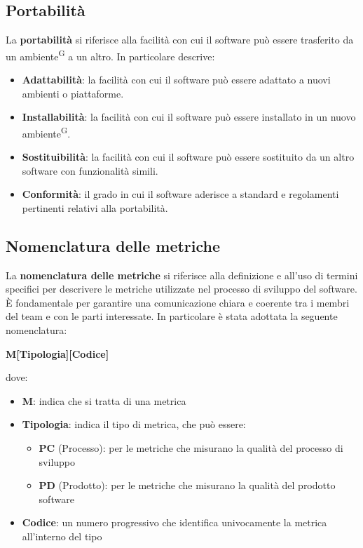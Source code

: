 \documentclass[a4paper, 11pt]{article}
\begin{document}
\subsection{Portabilità}
La \textbf{portabilità} si riferisce alla facilità con cui il software può essere trasferito da un ambiente\textsuperscript{G} a un altro.
In particolare descrive:
\begin{itemize}
    \item \textbf{Adattabilità}: la facilità con cui il software può essere adattato a nuovi ambienti o piattaforme.
    \item \textbf{Installabilità}: la facilità con cui il software può essere installato in un nuovo ambiente\textsuperscript{G}.
    \item \textbf{Sostituibilità}: la facilità con cui il software può essere sostituito da un altro software con funzionalità simili.
    \item \textbf{Conformità}: il grado in cui il software aderisce a standard e regolamenti pertinenti relativi alla portabilità.
\end{itemize}
\subsection{Nomenclatura delle metriche}
La \textbf{nomenclatura delle metriche} si riferisce alla definizione e all'uso di termini specifici per descrivere le metriche utilizzate nel processo di sviluppo del software. È fondamentale per garantire una comunicazione chiara e coerente tra i membri del team e con le parti interessate.
In particolare è stata adottata la seguente nomenclatura:

\begin{center}
    \textbf{M[Tipologia][Codice]}
\end{center}

dove:
\begin{itemize}
    \item \textbf{M}: indica che si tratta di una metrica
    \item \textbf{Tipologia}: indica il tipo di metrica, che può essere:
    \begin{itemize}
        \item \textbf{PC} (Processo): per le metriche che misurano la qualità del processo di sviluppo
        \item \textbf{PD} (Prodotto): per le metriche che misurano la qualità del prodotto software
    \end{itemize}
    \item \textbf{Codice}: un numero progressivo che identifica univocamente la metrica all'interno del tipo
\end{itemize}
\end{document}

